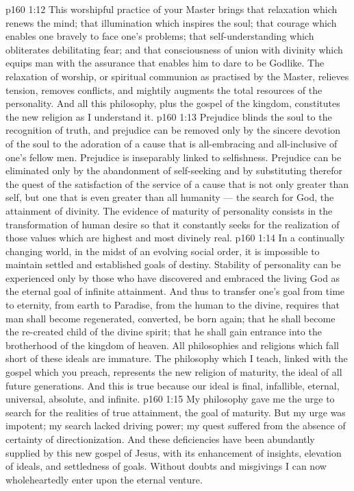 \vs p160 1:12 This worshipful practice of your Master brings that relaxation which renews the mind; that illumination which inspires the soul; that courage which enables one bravely to face one’s problems; that self\hyp{}understanding which obliterates debilitating fear; and that consciousness of union with divinity which equips man with the assurance that enables him to dare to be Godlike. The relaxation of worship, or spiritual communion as practised by the Master, relieves tension, removes conflicts, and mightily augments the total resources of the personality. And all this philosophy, plus the gospel of the kingdom, constitutes the new religion as I understand it.
\vs p160 1:13 \pc Prejudice blinds the soul to the recognition of truth, and prejudice can be removed only by the sincere devotion of the soul to the adoration of a cause that is all\hyp{}embracing and all\hyp{}inclusive of one’s fellow men. Prejudice is inseparably linked to selfishness. Prejudice can be eliminated only by the abandonment of self\hyp{}seeking and by substituting therefor the quest of the satisfaction of the service of a cause that is not only greater than self, but one that is even greater than all humanity --- the search for God, the attainment of divinity. The evidence of maturity of personality consists in the transformation of human desire so that it constantly seeks for the realization of those values which are highest and most divinely real.
\vs p160 1:14 In a continually changing world, in the midst of an evolving social order, it is impossible to maintain settled and established goals of destiny. Stability of personality can be experienced only by those who have discovered and embraced the living God as the eternal goal of infinite attainment. And thus to transfer one’s goal from time to eternity, from earth to Paradise, from the human to the divine, requires that man shall become regenerated, converted, be born again; that he shall become the re\hyp{}created child of the divine spirit; that he shall gain entrance into the brotherhood of the kingdom of heaven. All philosophies and religions which fall short of these ideals are immature. The philosophy which I teach, linked with the gospel which you preach, represents the new religion of maturity, the ideal of all future generations. And this is true because our ideal is final, infallible, eternal, universal, absolute, and infinite.
\vs p160 1:15 My philosophy gave me the urge to search for the realities of true attainment, the goal of maturity. But my urge was impotent; my search lacked driving power; my quest suffered from the absence of certainty of directionization. And these deficiencies have been abundantly supplied by this new gospel of Jesus, with its enhancement of insights, elevation of ideals, and settledness of goals. Without doubts and misgivings I can now wholeheartedly enter upon the eternal venture.
